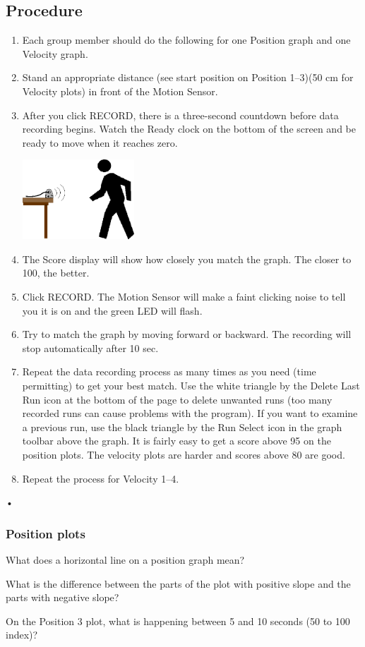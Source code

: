 \documentclass[main.tex]{subfiles}
\begin{document}
\subsection*{Procedure}
\begin{enumerate}
\item
Each group member should do the following for one Position graph and one Velocity graph.
\item
Stand an appropriate distance (see start position on Position 1--3)(50 cm for Velocity plots)  in front of the Motion Sensor. 
\item
After you click RECORD, there is a three-second countdown before data recording begins. Watch the Ready clock on the bottom of the screen and be ready to move when it reaches zero.  
\begin{center}
\includegraphics[width=0.33\textwidth]{Motion_Sensor}
\end{center}
\item
The Score display will show how closely you match the graph. The closer to 100, the better.
\item
Click RECORD. The Motion Sensor will make a faint clicking noise to tell you it is on and the green LED will flash.
\item
Try to match the graph by moving forward or backward.  The recording will stop automatically after 10 sec.
\item
Repeat the data recording process as many times as you need (time permitting) to get your best match.  Use the white triangle by the Delete Last Run icon at the bottom of the page to delete unwanted runs (too many recorded runs can cause problems with the program).  If you want to examine a previous run, use the black triangle by the Run Select icon in the graph toolbar above the graph.  It is fairly easy to get a score above 95 on the position plots.  The velocity plots are harder and scores above 80 are good.
\item
Repeat the process for Velocity 1--4.
\end{enumerate}•

\subsubsection*{Position plots}
\begin{question}
What does a horizontal line on a position graph mean?
\end{question}
\begin{question}
What is the difference between the parts of the plot with positive slope and the parts with negative slope?
\end{question}
\begin{question}
On the Position 3 plot, what is happening between 5 and 10 seconds (50 to 100 index)?
\end{question}
\end{document}
